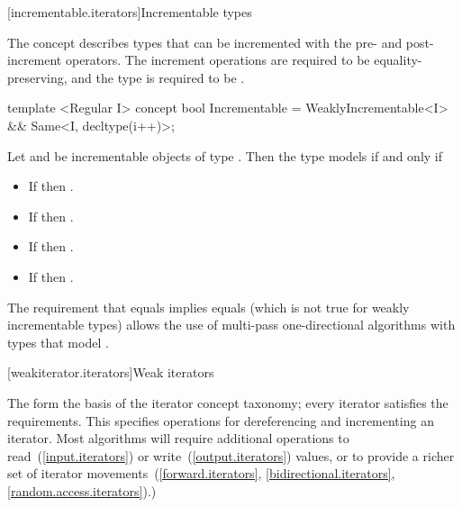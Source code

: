 \begin{addedblock}
[incrementable.iterators]{Incrementable types}

The  concept describes types that can be incremented with the pre-
and post-increment operators. The increment operations are required to be equality-preserving,
and the type is required to be .

%
\begin{codeblock}
  template <Regular I>
  concept bool Incrementable =
    WeaklyIncrementable<I> &&
    Same<I, decltype(i++)>;
\end{codeblock}

\pnum
Let  and  be incrementable objects of type .
Then the type  models  if and only if

\begin{itemize}
\item If  then .
\item If  then .
\item If  then .
\item If  then .
\end{itemize}


\pnum
\enternote The requirement that  equals  implies  equals 
(which is not true for weakly incrementable types) allows the use of multi-pass one-directional
algorithms with types that model .\exitnote

\end{addedblock}

[weakiterator.iterators]{Weak iterators}

\pnum
The   form
the basis of the iterator concept taxonomy; every iterator satisfies the
 requirements. This
 specifies operations for dereferencing and incrementing
an iterator. Most algorithms will require additional operations
 to
read~(\ref{input.iterators}) or write~(\ref{output.iterators}) values, or
to provide a richer set of iterator movements~(\ref{forward.iterators},
\ref{bidirectional.iterators}, \ref{random.access.iterators}).)

